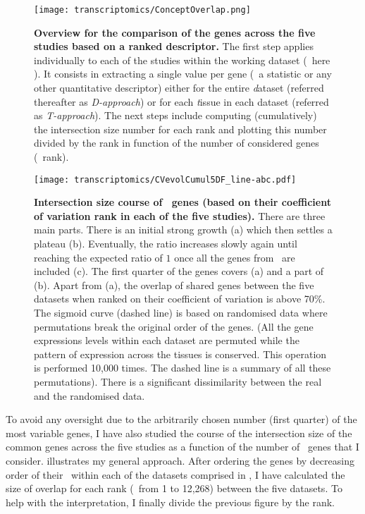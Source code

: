 \begin{figure}[!htpb]
    \texttt{[image: transcriptomics/ConceptOverlap.png]}\centering
    \caption[Overview for the comparison of the genes across the five
    studies based on a ranked descriptor 5 studies]{\label{fig:overlapConcept}%
    \textbf{Overview for the comparison of the genes across the five
    studies based on a ranked descriptor.}
    The first step applies individually to each of the studies
    within the working dataset (\ie\ here \setOne).
    It consists in extracting a single value per gene
    (\eg\ a statistic or any other quantitative descriptor)
    either for the entire \emph{d}ataset (referred thereafter as \emph{D-approach}) or
    for each \emph{t}issue in each dataset (referred as \emph{T-approach}).
    The next steps include
    computing (cumulatively) the intersection size number for each rank
    and plotting this number divided by the rank
    in function of the number of considered genes (\ie\ rank).}
\end{figure}

\begin{figure}[!htpb]
    \texttt{[image: transcriptomics/CVevolCumul5DF\_line-abc.pdf]}\centering
    \caption[Intersection size of \setOne\ genes (ranked by cv)]%
    {\label{fig:cvEvol5DF}\textbf{Intersection size course
    of \setOne\ genes (based on their coefficient of variation rank
    in each of the five studies).}
    There are three main parts.
    There is an initial strong growth (a)
    which then settles a plateau (b).
    Eventually, the ratio increases slowly again
    until reaching the expected ratio of $1$ once all the genes from \setOne\
    are included (c).
    The first quarter of the genes covers (a) and a part of (b).
    Apart from (a),
    the overlap of shared genes between the five datasets when ranked on their
    coefficient of variation is above 70\%.
    The sigmoid curve (dashed line) is based on randomised data
    where permutations break the original order of the genes. (All the gene
    expressions levels within each dataset are permuted while the pattern of
    expression across the tissues is conserved. This operation is performed 10,000 times.
    The dashed line is a summary of all these permutations).
    There is a significant dissimilarity between the real and the randomised data.}
\end{figure}

To avoid any oversight due to the arbitrarily chosen number (first quarter)
of the most variable genes,
I have also studied the course of the intersection size of the common genes
across the five studies
as a function of the number of \setOne\ genes that I consider.
 illustrates my general approach.
After ordering the genes by decreasing order of their \cv\
within each of the datasets comprised in \setOne,
I have calculated the size of overlap for each rank (\ie\ from 1 to 12,268)
between the five datasets.
To help with the interpretation,
I finally divide the previous figure by the rank.


